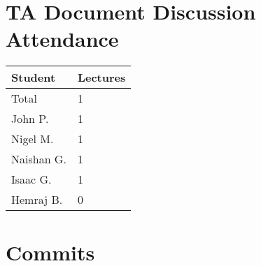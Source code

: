 \documentclass{article}
\begin{document}

\newpage
\section{TA Document Discussion Attendance}


\begin{table}[H]
\centering
\begin{tabular}{ll}
\toprule
\textbf{Student} & \textbf{Lectures}\\
\midrule
Total & 1\\
John P. & 1\\
Nigel M. & 1\\
Naishan G. & 1\\
Isaac G. & 1\\
Hemraj B. & 0\\
\bottomrule
\end{tabular}
\end{table}


\newpage
\section{Commits}



\pgfmathsetmacro{\CT}{\CJ + \CN + \CNS + \CH + \CI}

\end{document}
